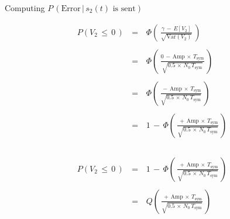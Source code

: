 \documentclass{Beamer}
\begin{document}
\begin{frame}[t,allowframebreaks]{Computing $P \, (\text{Error} \, | \, s_2(t) \text{ is sent})$}
\begin{itemize}
\begin{equation}
\begin{array}{rcl}
P (V_2 \, \leq \, 0 \,) \, &=& \, \Phi \left(\, \displaystyle\frac{\gamma  \, - \, E[V_2]}{ \sqrt{\text{Var}(V_2)}}  \, \right) \\ \\
&=& \, \Phi \left(\, \displaystyle\frac{0  \, - \, \text{Amp} \, \times \, T_{\text{sym}}}{\sqrt{0.5 \, \times \, N_0 \, T_{\text{sym}}} } \, \right) \\ \\
&=& \, \Phi \left(\, \displaystyle\frac{ \, - \, \text{Amp} \, \times \, T_{\text{sym}}}{\sqrt{0.5 \, \times \, N_0 \, T_{\text{sym}}} } \, \right) \\ \\
&=& \, 1 \, - \, \Phi \left(\, \displaystyle\frac{ \, + \, \text{Amp} \, \times \, T_{\text{sym}}}{\sqrt{0.5 \, \times \, N_0 \, T_{\text{sym}}} } \, \right) \\ \\
\end{array}
\end{equation}

\newpage

\begin{equation}
\begin{array}{rcl}
P (V_2 \, \leq \, 0 \,) \, &=& \,  1 \, - \, \Phi \left(\, \displaystyle\frac{ \, + \, \text{Amp} \, \times \, T_{\text{sym}}}{\sqrt{0.5 \, \times \, N_0 \, T_{\text{sym}}} } \, \right) \\ \\


&=& \, Q \left(\, \displaystyle\frac{ \, + \, \text{Amp} \, \times \, T_{\text{sym}}}{\sqrt{0.5 \, \times \, N_0 \, T_{\text{sym}}} } \, \right)
\end{array}
\end{equation}



\end{itemize}



\end{frame}
\end{document}
